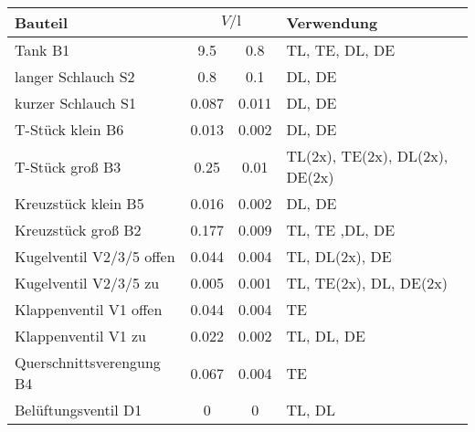 \label{tab:tabV}
	\begin{tabular}{l S[table-format=1.3] @{${}\pm{}$} S[table-format=1.3] l}
		\toprule
		{Bauteil} &  & {Verwendung}\\
		\midrule
		Tank B1 					& 9.5 	& 0.8 	& TL, TE, DL, DE\\
		langer Schlauch S2 			& 0.8 	& 0.1 	& DL, DE\\
		kurzer Schlauch S1 			& 0.087	& 0.011	& DL, DE\\
		T-Stück klein B6 			& 0.013	& 0.002	& DL, DE\\
		T-Stück groß B3		 		& 0.25	& 0.01	& TL(2x), TE(2x), DL(2x), DE(2x)\\
		Kreuzstück klein B5			& 0.016	& 0.002	& DL, DE\\
		Kreuzstück groß B2			& 0.177	& 0.009	& TL, TE ,DL, DE\\
		Kugelventil V2/3/5 offen	& 0.044	& 0.004	& TL, DL(2x), DE\\
		Kugelventil V2/3/5 zu		& 0.005	& 0.001	& TL, TE(2x), DL, DE(2x)\\
		Klappenventil V1 offen		& 0.044	& 0.004	& TE\\
		Klappenventil V1 zu			& 0.022	& 0.002	& TL, DL, DE\\
		Querschnittsverengung B4	& 0.067	& 0.004	& TE\\
		Belüftungsventil D1			& 0		& 0		& TL, DL\\
		\bottomrule
	\end{tabular}
